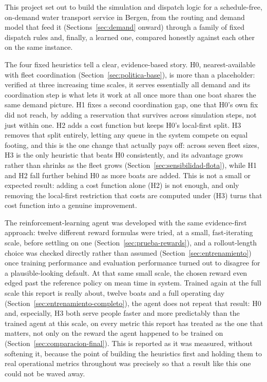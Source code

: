 \documentclass[11pt,a4paper]{article}
\begin{document}
This project set out to build the simulation and dispatch logic for a schedule-free, on-demand water transport service in Bergen, from the routing and demand model that feed it (Sections~\ref{sec:demand} onward) through a family of fixed dispatch rules and, finally, a learned one, compared honestly against each other on the same instance.

The four fixed heuristics tell a clear, evidence-based story. H0, nearest-available with fleet coordination (Section~\ref{sec:politica-base}), is more than a placeholder: verified at three increasing time scales, it serves essentially all demand and its coordination step is what lets it work at all once more than one boat shares the same demand picture. H1 fixes a second coordination gap, one that H0's own fix did not reach, by adding a reservation that survives across simulation steps, not just within one. H2 adds a cost function but keeps H0's local-first split. H3 removes that split entirely, letting any queue in the system compete on equal footing, and this is the one change that actually pays off: across seven fleet sizes, H3 is the only heuristic that beats H0 consistently, and its advantage grows rather than shrinks as the fleet grows (Section~\ref{sec:sensibilidad-flota}), while H1 and H2 fall further behind H0 as more boats are added. This is not a small or expected result: adding a cost function alone (H2) is not enough, and only removing the local-first restriction that costs are computed under (H3) turns that cost function into a genuine improvement.

The reinforcement-learning agent was developed with the same evidence-first approach: twelve different reward formulas were tried, at a small, fast-iterating scale, before settling on one (Section~\ref{sec:prueba-rewards}), and a rollout-length choice was checked directly rather than assumed (Section~\ref{sec:entrenamiento}) once training performance and evaluation performance turned out to disagree for a plausible-looking default. At that same small scale, the chosen reward even edged past the reference policy on mean time in system. Trained again at the full scale this report is really about, twelve boats and a full operating day (Section~\ref{sec:entrenamiento-completo}), the agent does not repeat that result: H0 and, especially, H3 both serve people faster and more predictably than the trained agent at this scale, on every metric this report has treated as the one that matters, not only on the reward the agent happened to be trained on (Section~\ref{sec:comparacion-final}). This is reported as it was measured, without softening it, because the point of building the heuristics first and holding them to real operational metrics throughout was precisely so that a result like this one could not be waved away.
\end{document}
